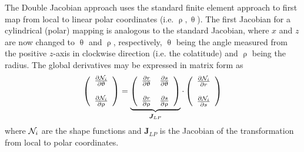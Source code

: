 The Double Jacobian approach uses the standard finite element approach to first map from local to linear polar coordinates (i.e. $\uprho,\uptheta$). The first Jacobian for a cylindrical (polar) mapping is analogous to the standard Jacobian, where $x$ and $z$ are now changed to $\uptheta$ and $\uprho$, 
respectively, $\uptheta$ being the angle measured from the positive $z$-axis 
in clockwise direction (i.e. the colatitude) and $\uprho$ being the radius.
The global derivatives may be expressed in matrix form as
\begin{equation}
\left(
\begin{array}{c}
\frac{\partial {\mathcal{N}}_i}{\partial \uptheta} \\ \\
\frac{\partial {\mathcal{N}}_i}{\partial \uprho} 
\end{array}
\right)
= 
\underbrace{\left(
\begin{array}{cc}
\frac{\partial r}{\partial \uptheta}  & 
\frac{\partial s}{\partial \uptheta}   \\ \\
\frac{\partial r}{\partial \uprho}  & 
\frac{\partial s}{\partial \uprho}  
\end{array}
\right)}_{{\bm J}_{LP}}
\cdot
\left(
\begin{array}{c}
\frac{\partial {\mathcal{N}}_i}{\partial r} \\ \\
\frac{\partial {\mathcal{N}}_i}{\partial s} 
\end{array}
\right)
\label{eq:DJ1}
\end{equation}
where ${\mathcal{N}}_i$ are the shape functions and ${\bm J}_{LP}$ 
is the Jacobian of the transformation from local to polar coordinates.

